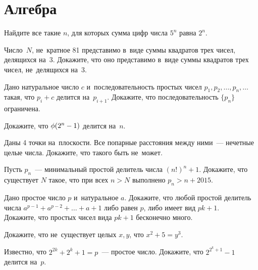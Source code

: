

\section*{Алгебра}


\begingroup \def\eulerphi{\mathrm{\phi}}

\begin{problems}

\item
Найдите все такие $n$, для которых сумма цифр числа $5^n$ равна $2^n$.

\item
Число~$N$, не~кратное 81 представимо в~виде суммы квадратов трех чисел,
делящихся на~3.
Докажите, что оно представимо в~виде суммы квадратов трех чисел, не~делящихся
на~3.

\item
Дано натуральное число $c$ и~последовательность простых чисел
$p_1, p_2, \ldots, p_n, \ldots$ такая, что $p_i + c$ делится на~$p_{i+1}$.
Докажите, что последовательность $\{p_n\}$ ограничена.

\item
Докажите, что $\eulerphi(2^n - 1)$ делится на~$n$.

\item
Даны 4 точки на~плоскости.
Все попарные расстояния между ними~--- нечетные целые числа.
Докажите, что такого быть не~может.

\item
Пусть $p_n$~--- минимальный простой делитель числа $(n!)^n + 1$.
Докажите, что существует $N$ такое, что при всех $n > N$ выполнено
$p_n > n + 2015$.

\item
\subproblem
Дано простое число $p$ и~натуральное $a$.
Докажите, что любой простой делитель числа $a^{p-1} + a^{p-2} + \ldots + a + 1$
либо равен $p$, либо имеет вид $p k + 1$.
\\
\subproblem
Докажите, что простых чисел вида $p k + 1$ бесконечно много.

\item
Докажите, что не~существует целых $x, y$, что $x^2 + 5 = y^3$.

\item
Известно, что $2^{2k} + 2^k + 1 = p$~--- простое число.
Докажите, что $2^{2^k+1} - 1$ делится на~$p$.

\end{problems}

\endgroup %

